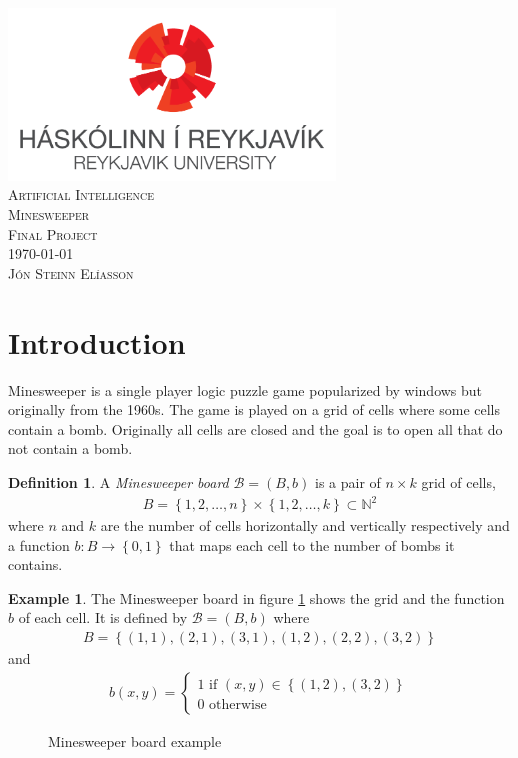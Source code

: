\documentclass[11pt,a4paper,notitlepage]{article}
\makeatletter
\newcommand{\N}{\mathbb{N}} %
\newcommand{\set}[1]{\left\{#1\right\}} %
\theoremstyle{definition}
\newtheorem{example}{Example}[section]
\newtheorem{definition}{Definition}[section]
\newcommand{\maketitlepage}
{
  \begin{titlepage}
    \begin{center}
      \ \\[2.5cm]
      \includegraphics[width=0.65\textwidth]{rulogo.png}\\[2.5cm]
      \textsc{\Huge Artificial Intelligence}\\[.5cm]
      \textsc{\huge Minesweeper}\\[.5cm]
      \textsc{\LARGE Final Project}\\[1.2cm]
      \textsc{\Large \today}\\[4cm]
      \textsc{\huge Jón Steinn Elíasson}\\[.3cm]      
      \text{jonse07@ru.is}
    \end{center}
    \vfill
  \end{titlepage}
}
\newcommand{\maketocpage}
{
  \tableofcontents
  \listoftables
  \listoffigures
  \lstlistoflistings
  \vfill
  \clearpage
}
\makeatother
\begin{document}
\maketitlepage
\maketocpage

\section{Introduction}
Minesweeper is a single player logic puzzle game popularized by windows but originally from the 1960s. \cite{wiki} The game is played on a grid of cells where some cells contain a bomb. Originally all cells are closed and the goal is to open all that do not contain a bomb. 

\begin{definition}
A \emph{Minesweeper board} $\mathcal{B} = (B,b)$ is a pair of $n \times k$ grid of cells, \begin{align*}
B = \set{1,2,\ldots,n} \times \set{1,2,\ldots,k} \subset \N^2
\end{align*}
where $n$ and $k$ are the number of cells horizontally and vertically respectively and a function $b : B \to \set{0,1}$ that maps each cell to the number of bombs it contains.
\end{definition}
\begin{example}
The Minesweeper board in figure \ref{fig:msb} shows the grid and the function $b$ of each cell. It is defined by $\mathcal{B} = (B,b)$ where
\begin{align*}
B = \set{(1,1),(2,1),(3,1),(1,2),(2,2),(3,2)}
\end{align*}
and
\begin{align*}
b(x,y) = 
\begin{cases} 
1 \mbox{ if } (x,y) \in \set{(1,2),(3,2)}\\
0 \mbox{ otherwise}
\end{cases}
\end{align*}
\begin{figure}[H]
\begin{center}
\end{center}
\caption{Minesweeper board example}
\label{fig:msb}
\end{figure}
\end{example}
\end{document}
